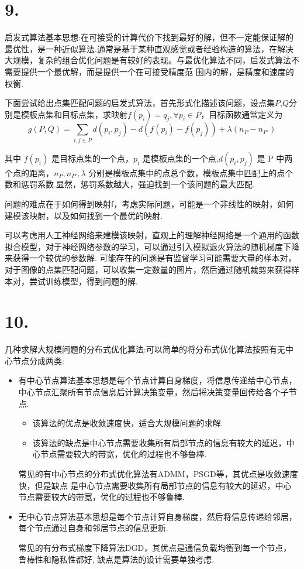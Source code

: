 \documentclass{article}
\begin{document}
	\section*{9.}

启发式算法基本思想:在可接受的计算代价下找到最好的解，但不一定能保证解的最优性，是一种近似算法.通常是基于某种直观感觉或者经验构造的算法，在解决大规模，复杂的组合优化问题是有较好的表现。与最优化算法不同，启发式算法不需要提供一个最优解，而是提供一个在可接受精度范
围内的解，是精度和速度的权衡.

下面尝试给出点集匹配问题的启发式算法，首先形式化描述该问题，设点集$P$,$Q$分别是模板点集和目标点集，求映射\(f(p_i)=q_j,\forall p_i \in P\)，目标函数通常定义为
\[g(P,Q)=\sum_{i,j \in P} d(p_i,p_j)-d(f(p_i)- f(p_j))+\lambda(n_P -n_{P'})\]

其中 \(f(p_i)\) 是目标点集的一个点，$p_i$ 是模板点集的一个点,$d(p_i,p_j)$ 是 P 中两个点的距离，$n_P,n_{P'},\lambda$ 分别是模板点集中的点总个数，模板点集中匹配上的点个数和惩罚系数.显然，惩罚系数越大，强迫找到一个该问题的最大匹配.

问题的难点在于如何得到映射f，考虑实际问题，可能是一个非线性的映射，如何建模该映射，以及如何找到一个最优的映射.

可以考虑用人工神经网络来建模该映射，直观上的理解神经网络是一个通用的函数拟合模型，对于神经网络参数的学习，可以通过引入模拟退火算法的随机梯度下降来获得一个较优的参数解. 可能存在的问题是有监督学习可能需要大量的样本对，对于图像的点集匹配问题，可以收集一定数量的图片，然后通过随机裁剪来获得样本对，尝试训练模型，得到问题的解.

	\section*{10.}

	几种求解大规模问题的分布式优化算法:可以简单的将分布式优化算法按照有无中心节点分成两类:
	\begin{itemize}
	\item 有中心节点算法基本思想是每个节点计算自身梯度，将信息传递给中心节点，中心节点汇聚所有节点信息后计算决策变量，然后将决策变量回传给各个子节点.
		\begin{itemize}
			\item 该算法的优点是收敛速度快，适合大规模问题的求解.
			\item 该算法的缺点是中心节点需要收集所有局部节点的信息有较大的延迟，中心节点需要较大的带宽，优化的过程也不够鲁棒.
		\end{itemize}
	
	常见的有中心节点的分布式优化算法有ADMM，PSGD等，其优点是收敛速度快，但是缺点
	是中心节点需要收集所有局部节点的信息有较大的延迟，中心节点需要较大的带宽，优化的过程也不够鲁棒.

	\item 无中心节点算法基本思想是每个节点计算自身梯度，然后将信息传递给邻居，每个节点通过自身和邻居节点的信息更新.
		
	常见的有分布式梯度下降算法DGD，其优点是通信负载均衡到每一个节点，鲁棒性和隐私性都好, 缺点是算法的设计需要单独考虑.

	\end{itemize}
\end{document}
